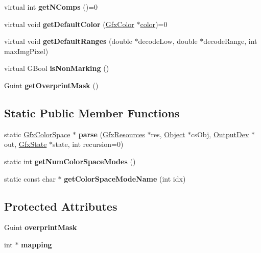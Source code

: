 \begin{DoxyCompactItemize}
virtual int {\bfseries get\+N\+Comps} ()=0
\item 
\mbox{\label{class_gfx_color_space_a46216c9497adc828d92c23b3ef3ec874}} 
virtual void {\bfseries get\+Default\+Color} (\hyperlink{struct_gfx_color}{Gfx\+Color} $\ast$\hyperlink{structcolor}{color})=0
\item 
\mbox{\label{class_gfx_color_space_ae6ef6bf8cc5350a86163d8c924c28259}} 
virtual void {\bfseries get\+Default\+Ranges} (double $\ast$decode\+Low, double $\ast$decode\+Range, int max\+Img\+Pixel)
\item 
\mbox{\label{class_gfx_color_space_a17f370ed734b51be5389a47c73f44a07}} 
virtual G\+Bool {\bfseries is\+Non\+Marking} ()
\item 
\mbox{\label{class_gfx_color_space_a1e2df22dd9f134c45e538c81817ecece}} 
Guint {\bfseries get\+Overprint\+Mask} ()
\end{DoxyCompactItemize}
\subsection*{Static Public Member Functions}
\begin{DoxyCompactItemize}
\item 
\mbox{\label{class_gfx_color_space_a5148e906da19d9fb4f1ed8bc58aa9c69}} 
static \hyperlink{class_gfx_color_space}{Gfx\+Color\+Space} $\ast$ {\bfseries parse} (\hyperlink{class_gfx_resources}{Gfx\+Resources} $\ast$res, \hyperlink{class_object}{Object} $\ast$cs\+Obj, \hyperlink{class_output_dev}{Output\+Dev} $\ast$out, \hyperlink{class_gfx_state}{Gfx\+State} $\ast$state, int recursion=0)
\item 
\mbox{\label{class_gfx_color_space_ae3246de274ca29e6b3f8c9518bcd7e7a}} 
static int {\bfseries get\+Num\+Color\+Space\+Modes} ()
\item 
\mbox{\label{class_gfx_color_space_a565e06b7691f78e2cb116c9ae86a75d8}} 
static const char $\ast$ {\bfseries get\+Color\+Space\+Mode\+Name} (int idx)
\end{DoxyCompactItemize}
\subsection*{Protected Attributes}
\begin{DoxyCompactItemize}
\item 
\mbox{\label{class_gfx_color_space_a98d9d81b6aed7ad9d9164ef834478e66}} 
Guint {\bfseries overprint\+Mask}
\item 
\mbox{\label{class_gfx_color_space_abb58f49030532ce0472969de9aeb94aa}} 
int $\ast$ {\bfseries mapping}
\end{DoxyCompactItemize}


